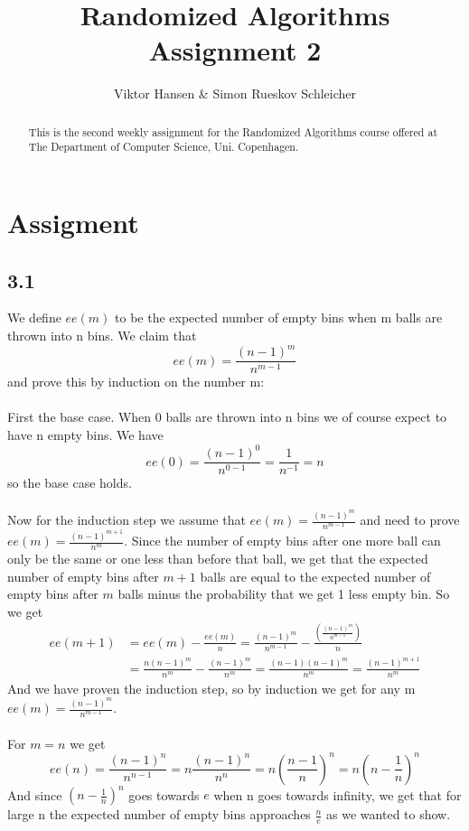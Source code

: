 \documentclass[12pt]{article}
\begin{document}
\nocite{*}


\title{Randomized Algorithms \\
       Assignment 2}

\author{Viktor Hansen \& Simon Rueskov Schleicher}

\maketitle

\begin{abstract}
  This is the second weekly assignment for the Randomized Algorithms course offered at The Department of Computer Science, Uni. Copenhagen.
\end{abstract}

\pagebreak

\section*{Assigment}

\subsection*{3.1}
We define $ee(m)$ to be the expected number of empty bins when m balls are thrown into n bins. We claim that $$ee(m)=\frac{(n-1)^m}{n^{m-1}}$$ and prove this by induction on the number m:\\
\\
First the base case. When 0 balls are thrown into n bins we of course expect to have n empty bins. We have $$ee(0)=\frac{(n-1)^0}{n^{0-1}}=\frac{1}{n^{-1}}=n$$ so the base case holds.\\
\\
Now for the induction step we assume that $ee(m)=\frac{(n-1)^m}{n^{m-1}}$ and need to prove $ee(m)=\frac{(n-1)^{m+1}}{n^m}$. Since the number of empty bins after one more ball can only be the same or one less than before that ball, we get that the expected number of empty bins after $m+1$ balls are equal to the expected number of empty bins after $m$ balls minus the probability that we get 1 less empty bin. So we get \begin{align*}ee(m+1)&=ee(m)-\frac{ee(m)}{n}=\frac{(n-1)^m}{n^{m-1}}-\frac{\left(\frac{(n-1)^m}{n^{m-1}}\right)}{n}\\&=\frac{n(n-1)^m}{n^m}-\frac{(n-1)^m}{n^m}=\frac{(n-1)(n-1)^m}{n^m}=\frac{(n-1)^{m+1}}{n^m}\end{align*}
And we have proven the induction step, so by induction we get for any m $ee(m)=\frac{(n-1)^m}{n^{m-1}}$.\\
\\
For $m=n$ we get $$ee(n)=\frac{(n-1)^n}{n^{n-1}}=n\frac{(n-1)^n}{n^n}=n\left(\frac{n-1}{n}\right)^n=n\left(n-\frac{1}{n}\right)^n$$ And since $\left(n-\frac{1}{n}\right)^n$ goes towards $e$ when n goes towards infinity, we get that for large n the expected number of empty bins approaches $\frac{n}{e}$ as we wanted to show.
\end{document}
